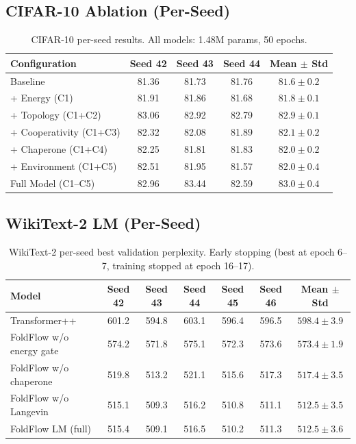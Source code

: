 \documentclass[10pt]{article}
\begin{document}
\subsection{CIFAR-10 Ablation (Per-Seed)}

\begin{table}[h]
\centering
\caption{CIFAR-10 per-seed results.  All models: 1.48M params, 50 epochs.}
\label{tab:cifar_per_seed}
\small
\begin{tabular}{@{}lccc|c@{}}
\toprule
Configuration & Seed 42 & Seed 43 & Seed 44 & Mean $\pm$ Std \\
\midrule
Baseline           & 81.36 & 81.73 & 81.76 & $81.6 \pm 0.2$ \\
+ Energy (C1)      & 81.91 & 81.86 & 81.68 & $81.8 \pm 0.1$ \\
+ Topology (C1+C2) & 83.06 & 82.92 & 82.79 & $82.9 \pm 0.1$ \\
+ Cooperativity (C1+C3) & 82.32 & 82.08 & 81.89 & $82.1 \pm 0.2$ \\
+ Chaperone (C1+C4) & 82.25 & 81.81 & 81.83 & $82.0 \pm 0.2$ \\
+ Environment (C1+C5) & 82.51 & 81.95 & 81.57 & $82.0 \pm 0.4$ \\
\midrule
Full Model (C1--C5) & 82.96 & 83.44 & 82.59 & $83.0 \pm 0.4$ \\
\bottomrule
\end{tabular}
\end{table}

\subsection{WikiText-2 LM (Per-Seed)}

\begin{table}[h]
\centering
\caption{WikiText-2 per-seed best validation perplexity.  Early stopping
  (best at epoch 6--7, training stopped at epoch 16--17).}
\label{tab:wt2_per_seed}
\small
\begin{tabular}{@{}lccccc|c@{}}
\toprule
Model & Seed 42 & Seed 43 & Seed 44 & Seed 45 & Seed 46 & Mean $\pm$ Std \\
\midrule
Transformer++            & 601.2 & 594.8 & 603.1 & 596.4 & 596.5 & $598.4 \pm 3.9$ \\
FoldFlow w/o energy gate & 574.2 & 571.8 & 575.1 & 572.3 & 573.6 & $573.4 \pm 1.9$ \\
FoldFlow w/o chaperone   & 519.8 & 513.2 & 521.1 & 515.6 & 517.3 & $517.4 \pm 3.5$ \\
FoldFlow w/o Langevin    & 515.1 & 509.3 & 516.2 & 510.8 & 511.1 & $512.5 \pm 3.5$ \\
FoldFlow LM (full)       & 515.4 & 509.1 & 516.5 & 510.2 & 511.3 & $512.5 \pm 3.6$ \\
\bottomrule
\end{tabular}
\end{table}
\end{document}
